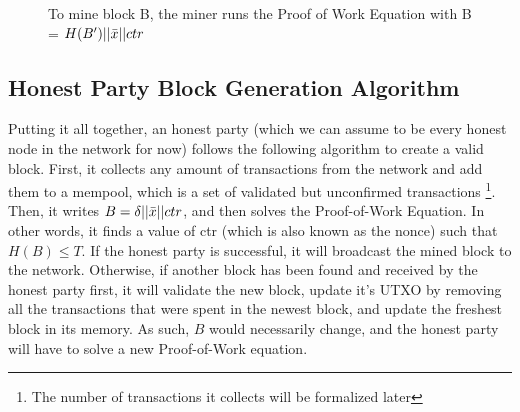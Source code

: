 \begin{figure}[H]

    \caption{To mine block B, the miner runs the Proof of Work Equation with B = $H(B')||\Bar{x}||ctr$}
    \label{fig:my_label}
\end{figure}


\subsection{Honest Party Block Generation Algorithm}

Putting it all together, an honest party (which we can assume to be every honest node in the network for now) follows the following algorithm to create a valid block. First, it collects any amount of transactions from the network and add them to a mempool, which is a set of validated but unconfirmed transactions \footnote{The number of transactions it collects will be formalized later}. Then, it writes $B = \delta||\Bar{x}||ctr$, and then solves the Proof-of-Work Equation. In other words, it finds a value of ctr (which is also known as the nonce) such that $H(B) \leq T$. If the honest party is successful, it will broadcast the mined block to the network. Otherwise, if another block has been found and received by the honest party first, it will validate the new block, update it's UTXO by removing all the transactions that were spent in the newest block, and update the freshest block in its memory. As such, $B$ would necessarily change, and the honest party will have to solve a new Proof-of-Work equation.


